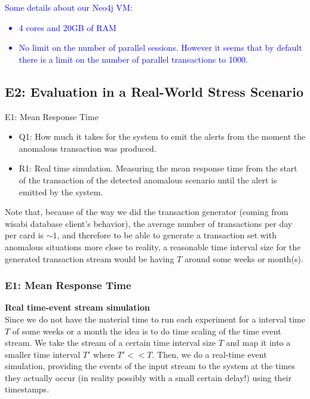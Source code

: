 \documentclass[12pt,a4paper]{article}
\begin{document}
\textcolor{blue}{Some details about our Neo4j VM:
\begin{itemize}
    \item 4 cores and 20GB of RAM
    \item No limit on the number of parallel sessions. However it seems that by default there is a limit on the number of parallel transactions to 1000.
\end{itemize}
}

\subsection*{E2: Evaluation in a Real-World Stress Scenario}


E1: Mean Response Time

\begin{itemize}
  \item Q1: How much it takes for the system to emit the alerts from the moment the anomalous transaction was produced.
  \item R1: Real time simulation. Measuring the mean response time from the start of the transaction of the detected anomalous scenario until the alert is emitted by the system.
\end{itemize}


Note that, because of the way we did the transaction generator (coming from wisabi database client's behavior), the average number of transactions per day per card is $\sim1$, and therefore to be able to generate a transaction set with anomalous situations more close to reality, a reasonable time interval size for the generated transaction stream would be having $T$ around some weeks or month(s).

\subsubsection{E1: Mean Response Time}

\textbf{Real time-event stream simulation\\}
Since we do not have the material time to run each experiment for a interval time $T$ of some weeks or a month the idea is to do time scaling of the time event stream. We take the stream of a certain time interval size $T$ and map it into a smaller time interval
$T'$ where $T' << T$. Then, we do a real-time event simulation, providing the events of the input stream to the system at the times they actually occur (in reality possibly with a small certain delay!) using their timestamps.
\end{document}
